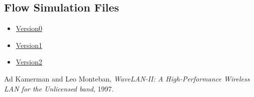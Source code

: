 \documentclass[a4paper,12pt,oneside]{book}
\begin{document}
\subsection{Flow Simulation Files}
\begin{itemize}
    \item \href{https://drive.google.com/open?id=0B8nJz0e_p6YNY2tDaUpiR3BRZXc}{Version0}
    \item \href{https://drive.google.com/open?id=0B8nJz0e_p6YNaVZpd2Y5OVdYSVE}{Version1}
    \item \href{https://drive.google.com/open?id=0B8nJz0e_p6YNTGNyNHEzUktRTFk}{Version2}
\end{itemize}

\begin{thebibliography}{li}
Ad Kamerman and Leo Monteban,
{\em WaveLAN-II: A High-Performance Wireless LAN for the Unlicensed band},
1997.

\end{thebibliography}
\end{document}
